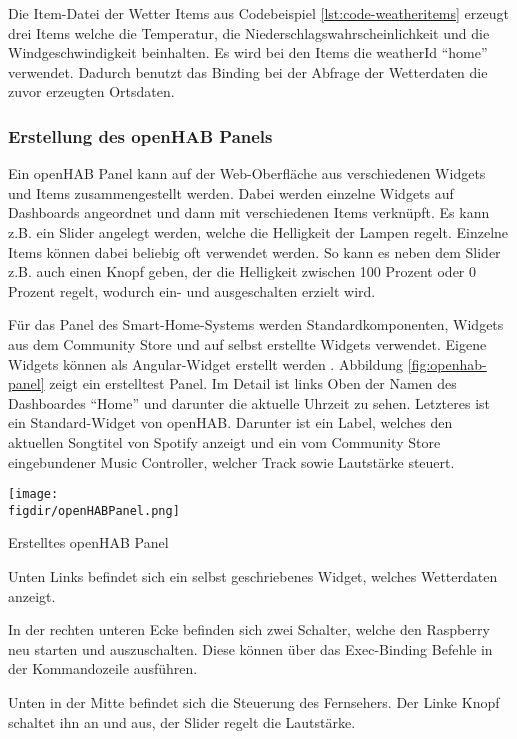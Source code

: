 		Die Item-Datei der Wetter Items aus Codebeispiel \ref{lst:code-weatheritems} erzeugt drei Items welche die Temperatur, die Niederschlagswahrscheinlichkeit und die Windgeschwindigkeit beinhalten.
		Es wird bei den Items die weatherId "`home"' verwendet. Dadurch benutzt das Binding bei der Abfrage der Wetterdaten die zuvor erzeugten Ortsdaten.
		
		\subsubsection{Erstellung des openHAB Panels}
		Ein openHAB Panel kann auf der Web-Oberfläche aus verschiedenen Widgets und Items zusammengestellt werden. Dabei werden einzelne Widgets auf Dashboards angeordnet und dann mit verschiedenen Items verknüpft. Es kann z.B. ein Slider angelegt werden, welche die Helligkeit der Lampen regelt. Einzelne Items können dabei beliebig oft verwendet werden. So kann es neben dem Slider z.B. auch einen Knopf geben, der die Helligkeit zwischen 100 Prozent oder 0 Prozent regelt, wodurch ein- und ausgeschalten erzielt wird.
		
		Für das Panel des Smart-Home-Systems werden Standardkomponenten, Widgets aus dem Community Store und auf selbst erstellte Widgets verwendet. Eigene Widgets können als Angular-Widget erstellt werden \cite{DB:widget}.
		Abbildung \ref{fig:openhab-panel} zeigt ein erstelltest Panel. Im Detail ist links Oben der Namen des Dashboardes "`Home"' und darunter die aktuelle Uhrzeit zu sehen. Letzteres ist ein Standard-Widget von openHAB.
		Darunter ist ein Label, welches den aktuellen Songtitel von Spotify anzeigt und ein vom Community Store eingebundener Music Controller, welcher Track sowie Lautstärke steuert.
		\\
		\begin{minipage}{\textwidth}
			\centering
			\captionsetup{type=figure}
			\texttt{[image: \\figdir/openHABPanel.png]}
			\caption{Erstelltes openHAB Panel \label{fig:openhab-panel}}
		\end{minipage}
		\smallskip

		Unten Links befindet sich ein selbst geschriebenes Widget, welches Wetterdaten anzeigt.

		In der rechten unteren Ecke befinden sich zwei Schalter, welche den Raspberry neu starten und auszuschalten. Diese können über das Exec-Binding Befehle in der Kommandozeile ausführen.
		
		Unten in der Mitte befindet sich die Steuerung des Fernsehers. Der Linke Knopf schaltet ihn an und aus, der Slider regelt die Lautstärke.
		
